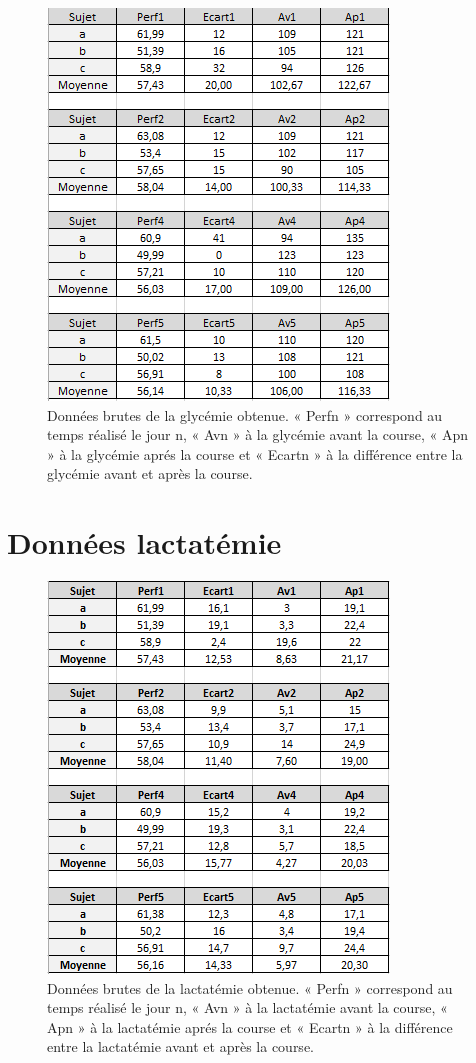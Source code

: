\documentclass[oneside,12pt, numbered]{book}
\begin{document}
         \begin{figure}[H]
            \centering
            \includegraphics[scale=1.5]{images/donnees_gly}
            \caption{\label{fig:donnees_gly}Données brutes de la glycémie obtenue. « Perfn » correspond au temps réalisé le jour n, « Avn » à la glycémie avant la course, « Apn » à la glycémie aprés la course et « Ecartn » à la différence entre la glycémie avant et après la course.}
        \end{figure}
        
        \chapter{Données lactatémie}
        \label{annexe_lact}
        
        \begin{figure}[H]
            \centering
            \includegraphics[scale=1.5]{images/donnees_lact}
            \caption{\label{fig:donnees_lact}Données brutes de la lactatémie obtenue. « Perfn » correspond au temps réalisé le jour n, « Avn » à la lactatémie avant la course, « Apn » à la lactatémie aprés la course et « Ecartn » à la différence entre la lactatémie avant et après la course. }
        \end{figure}
        
\end{document}
